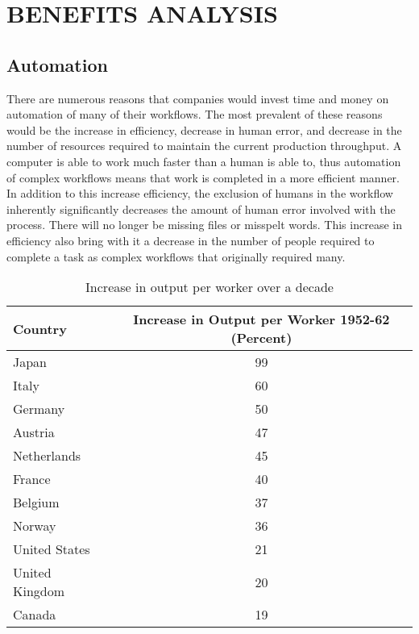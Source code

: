 \section{BENEFITS ANALYSIS} %
\label{sec:benefits_analysis}

\subsection{Automation} %
\label{sub:automation}
There are numerous reasons that companies would invest time and money on automation of many of their workflows. The most prevalent of these reasons would be the increase in efficiency, decrease in human error, and decrease in the number of resources required to maintain the current production throughput. A computer is able to work much faster than a human is able to, thus automation of complex workflows means that work is completed in a more efficient manner. In addition to this increase efficiency, the exclusion of humans in the workflow inherently significantly decreases the amount of human error involved with the process.  There will no longer be missing files or misspelt words. This increase in efficiency also bring with it a decrease in the number of people required to complete a task as complex workflows that originally required many.

	\begin{table}[ht]
		\centering
		\caption[Increase in output per worker]{Increase in output per worker over a decade\cite{Terborgh}}
		\label{tab:automation_benefits}
		\begin{tabular}{| l | c |} 
			\hline
			Country & Increase in Output per Worker 1952-62 (Percent)\\ \hline
			Japan & 99 \\ \hline 
			Italy & 60 \\ \hline 
			Germany & 50 \\ \hline
			Austria & 47 \\ \hline
			Netherlands & 45 \\ \hline
			France & 40 \\ \hline
			Belgium & 37 \\ \hline
			Norway & 36 \\ \hline
			United States & 21 \\ \hline
			United Kingdom & 20 \\ \hline
			Canada & 19 \\ 
			\hline 
		\end{tabular}
	\end{table}
	
